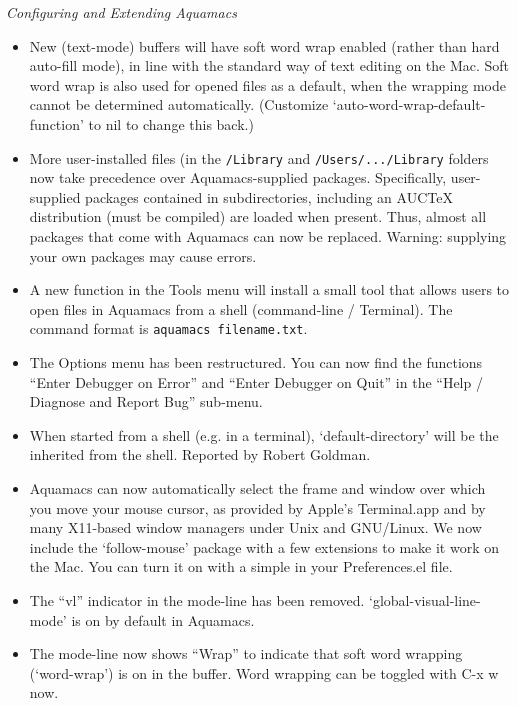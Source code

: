 \emph{Configuring and Extending Aquamacs}
\begin{itemize}
\item New (text-mode) buffers will have soft word wrap enabled (rather than hard auto-fill mode), in line with the standard way of text editing on the Mac.  Soft word wrap is also used for opened files as a default, when the wrapping mode cannot be determined automatically.  (Customize `auto-word-wrap-default-function' to nil to change this back.)
 
\item More user-installed files (in the {\tt /Library} and {\tt /Users/.../Library} folders now take precedence over Aquamacs-supplied packages.  Specifically, user-supplied packages contained in subdirectories, including an AUCTeX distribution (must be compiled) are loaded when present.  Thus, almost all packages that come with Aquamacs can now be replaced.
Warning: supplying your own packages may cause errors. 

\item A new function in the Tools menu will install a small tool that allows users to open files in Aquamacs from a shell (command-line / Terminal).  The command format is {\tt aquamacs filename.txt}.

\item The Options menu has been restructured. You can now find the functions ``Enter Debugger on Error'' and ``Enter Debugger on Quit'' in the ``Help / Diagnose and Report Bug'' sub-menu.

\item When started from a shell (e.g. in a terminal), `default-directory' will be the inherited from the shell.
Reported by Robert Goldman.

\item Aquamacs can now automatically select the frame and window over which you move your mouse cursor, as provided by Apple's Terminal.app and by many X11-based window managers under Unix and GNU/Linux.  We now include the `follow-mouse' package with a few extensions to make it work on the Mac.  You can turn it on with a simple in your Preferences.el file.

\item The ``vl'' indicator in the mode-line has been removed. `global-visual-line-mode' is on by default in Aquamacs.
\item The mode-line now shows ``Wrap'' to indicate that soft word wrapping (`word-wrap') is on in the buffer.  Word wrapping can be toggled with C-x w now.



\end{itemize}
